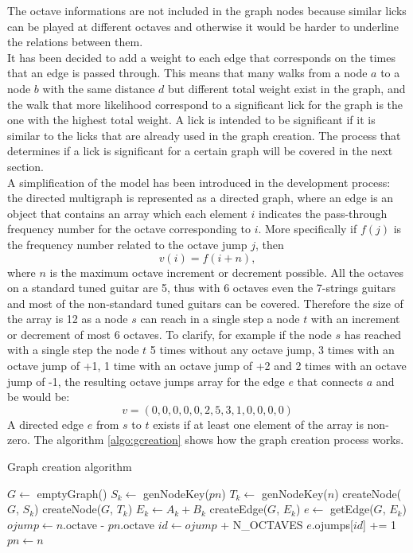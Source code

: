 \documentclass{llncs}
\begin{document}
The octave informations are not included in the graph nodes because 
similar licks can be played at different octaves and otherwise it would be
harder to underline the relations between them.\\
It has been decided to add a weight to each edge that corresponds on the
times that an edge is passed through. This means that many walks
from a node $a$ to a node $b$ with the same distance $d$ but different
total weight exist in the graph, and the walk that more likelihood
correspond to a significant lick for the graph is the one with the
highest total weight. A lick is intended to be significant if it is
similar to the licks that are already used in the graph creation. The
process that determines if a lick is significant for a certain graph will
be covered in the next section.\\
A simplification of the model has been introduced in the development
process: the directed multigraph is represented as a directed graph,
where an edge is an object that contains an array which each element $i$
indicates the pass-through frequency number for the octave corresponding
to $i$. More specifically if $f(j)$ is the frequency number related to the
octave jump $j$, then 
\[ v(i) = f(i + n), \]
where $n$ is the maximum octave increment or decrement possible.
All the octaves on a standard tuned guitar are 5, thus with 6 octaves even
the 7-strings guitars and most of the non-standard tuned guitars can be
covered. Therefore the size of the array is 12 as a node $s$ can reach
in a single step a node $t$ with an increment or decrement of most 6
octaves. To clarify, for example if the node $s$ has reached with a
single step the node
$t$ 5 times without any octave jump, 3 times with an octave jump of +1, 
1 time with an octave jump of +2
and 2 times with an octave jump of -1, the resulting octave jumps array
for the edge $e$ that connects $a$ and be would be:
\[ v = (0,0,0,0,0,2,5,3,1,0,0,0,0) \]
 A directed edge $e$ from $s$ to $t$ exists if at least one
element of the array is non-zero.
The algorithm \ref{algo:gcreation} shows how the graph creation process
works.
\begin{algorithm}
\caption{Graph creation algorithm}
\label{algo:gcreation}
\begin{algorithmic}[1]
	\State $G \gets $ emptyGraph()
				\State $S_k \gets $ genNodeKey($pn$)
				\State $T_k \gets $ genNodeKey($n$)
					\State createNode($G$, $S_k$)
				\EndIf
					\State createNode($G$, $T_k$)
				\EndIf
				\State $E_k\gets A_k + B_k$ 
				\small
					\State createEdge($G$, $E_k$)
				\EndIf
				\State $e \gets$ getEdge($G$, $E_k$)
				\State $ojump \gets n$.octave - $pn$.octave 
				\State $id \gets ojump$ + N\_OCTAVES
				\small
				\State $e$.ojumps[$id$] += 1
			\EndIf
			\State $pn \gets n$
		\EndFor
	\EndFor
\EndFunction
\end{algorithmic}
\end{algorithm}
\end{document}
